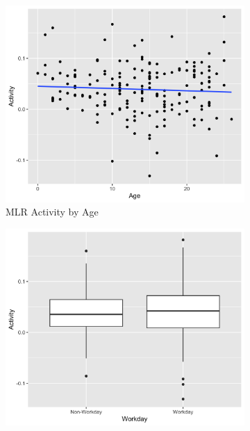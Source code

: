 \documentclass[12pt,twoside,letterpaper]{article}
\theoremstyle{definition}
\theoremstyle{definition}
\begin{document}
        \begin{figure} 
            \centering
            \begin{subfigure}[b]{0.32\textwidth}
            \centering
            \includegraphics[width=\textwidth]{pics/mlr act by age.png}
            \caption[]%
            {{\small MLR Activity by Age}}
            \label{fig: act v age}
            \end{subfigure}
            \hfill
            \begin{subfigure}[b]{0.32\textwidth}
            \centering
            \includegraphics[width=\textwidth]{pics/mlr act by day.png}

\end{subfigure}
\end{figure}
\end{document}
